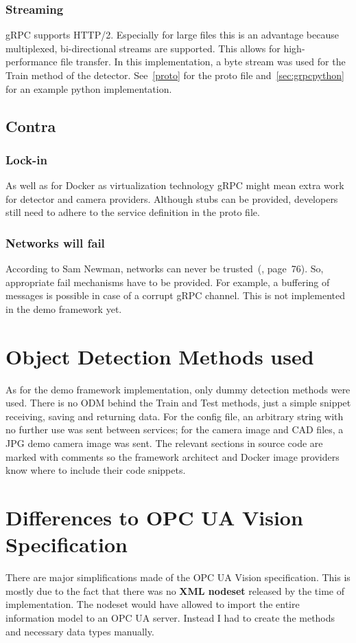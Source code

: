 \subsubsection{Streaming}
gRPC supports HTTP/2. Especially for large files this is an advantage because multiplexed, bi-directional streams are supported. This allows for high-performance file transfer. In this implementation, a byte stream was used for the Train method of the detector. See~\ref{proto} for the proto file and~\ref{sec:grpcpython} for an example python implementation.

\subsection{Contra}
\subsubsection{Lock-in}
As well as for Docker as virtualization technology gRPC might mean extra work for detector and camera providers. Although stubs can be provided, developers still need to adhere to the service definition in the proto file.

\subsubsection{Networks will fail}
According to Sam Newman, networks can never be trusted~(\cite{Newman2015BuildingMicroservices}, page~76). So, appropriate fail mechanisms have to be provided. For example, a buffering of messages is possible in case of a corrupt gRPC channel. This is not implemented in the demo framework yet.

\section{Object Detection Methods used}
As for the demo framework implementation, only dummy detection methods were used. There is no ODM behind the Train and Test methods, just a simple snippet receiving, saving and returning data. For the config file, an arbitrary string with no further use was sent between services; for the camera image and CAD files, a JPG demo camera image was sent. The relevant sections in source code are marked with comments so the framework architect and Docker image providers know where to include their code snippets.

\section{Differences to OPC UA Vision Specification}
There are major simplifications made of the OPC UA Vision specification. This is mostly due to the fact that there was no \textbf{XML nodeset} released by the time of implementation. The nodeset would have allowed to import the entire information model to an OPC UA server. Instead I had to create the methods and necessary data types manually.

